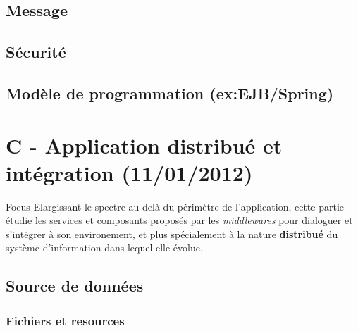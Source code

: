 \subsection{Message}

\subsection{Sécurité}
\subsection{Modèle de programmation (ex:EJB/Spring)}

\section{C - Application distribué et intégration (11/01/2012)}
\begin{frame}
  \begin{block}{Focus}
    Elargissant le spectre au-delà du périmètre de l'application,
    cette partie étudie les services et composants proposés par les
    \textit{middlewares} pour dialoguer et s'intégrer à son environement, et
    plus spécialement à la nature \textbf{distribué} du système d'information
    dans lequel elle évolue.
  \end{block}
\end{frame}
\subsection{Source de données}

\subsubsection{Fichiers et resources}

